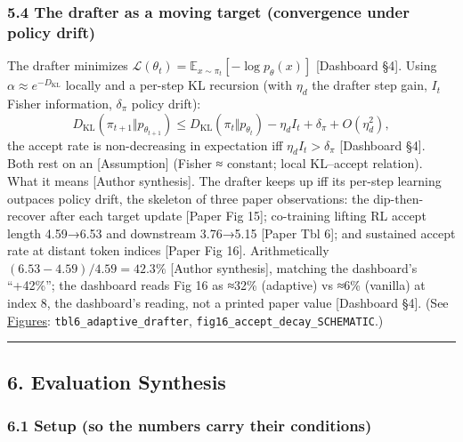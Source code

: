 \documentclass[
  11pt,
  letterpaper,
]{article}
\begin{document}
\subsubsection{5.4 The drafter as a moving target (convergence under
policy
drift)}\label{the-drafter-as-a-moving-target-convergence-under-policy-drift}

The drafter minimizes
\(\mathcal{L}(\theta_t)=\mathbb{E}_{x\sim\pi_t}[-\log p_\theta(x)]\)
{[}Dashboard §4{]}. Using \(\alpha\approx e^{-D_{\text{KL}}}\) locally
and a per-step KL recursion (with \(\eta_d\) the drafter step gain,
\(I_t\) Fisher information, \(\delta_\pi\) policy drift):
\[D_{\text{KL}}(\pi_{t+1}\Vert p_{\theta_{t+1}})\le D_{\text{KL}}(\pi_t\Vert p_{\theta_t})-\eta_d I_t+\delta_\pi+O(\eta_d^2),\]
the accept rate is non-decreasing in expectation iff
\(\eta_d I_t>\delta_\pi\) {[}Dashboard §4{]}. Both rest on an
{[}Assumption{]} (Fisher ≈ constant; local KL--accept relation). What it
means {[}Author synthesis{]}. The drafter keeps up iff its per-step
learning outpaces policy drift, the skeleton of three paper
observations: the dip-then-recover after each target update {[}Paper Fig
15{]}; co-training lifting RL accept length 4.59→6.53 and downstream
3.76→5.15 {[}Paper Tbl 6{]}; and sustained accept rate at distant token
indices {[}Paper Fig 16{]}. Arithmetically \((6.53-4.59)/4.59=42.3\%\)
{[}Author synthesis{]}, matching the dashboard's ``+42\%''; the
dashboard reads Fig 16 as ≈32\% (adaptive) vs ≈6\% (vanilla) at index 8,
the dashboard's reading, not a printed paper value {[}Dashboard §4{]}.
(See \hyperref[figures]{Figures}: \texttt{tbl6\_adaptive\_drafter},
\texttt{fig16\_accept\_decay\_SCHEMATIC}.)

\begin{center}\rule{0.5\linewidth}{0.5pt}\end{center}

\subsection{6. Evaluation Synthesis}\label{evaluation-synthesis}

\subsubsection{6.1 Setup (so the numbers carry their
conditions)}\label{setup-so-the-numbers-carry-their-conditions}
\end{document}
